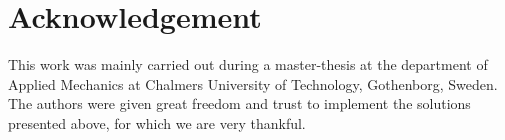 \documentclass[root.tex]{subfiles}
\begin{document}
{\pagestyle{empty}}
\section{Acknowledgement}
\label{chap:Acknowledgement}
This work was mainly carried out during a master-thesis at the department of Applied Mechanics at Chalmers University of Technology, Gothenborg, Sweden\cite{franzreal}. The authors were given great freedom and trust to implement the solutions presented above, for which we are very thankful. 
\end{document}
